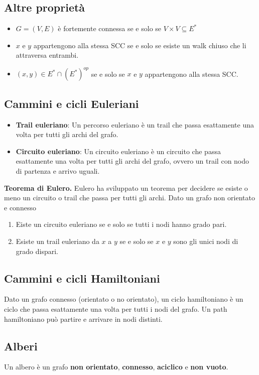 \documentclass{article}
\begin{document}
\subsection*{Altre proprietà}
\begin{itemize}
    \item \(G = (V,E)\) è fortemente connessa se e solo se \(V \times V \subseteq E^*\)
    \item \(x\) e \(y\) appartengono alla stessa SCC se e solo se esiste un walk chiuso che li attraversa entrambi.
    \item \((x,y) \in E^* \cap (E^*)^{op}\) se e solo se \(x\) e \(y\) appartengono alla stessa SCC.
\end{itemize}
\subsection*{Cammini e cicli Euleriani}
\begin{itemize}
    \item \textbf{Trail euleriano}: Un percorso euleriano è un trail che passa esattamente una volta per tutti gli archi del grafo.
    \item \textbf{Circuito euleriano}: Un circuito euleriano è un circuito che passa esattamente una volta per tutti gli archi del grafo, ovvero un trail con nodo di partenza e arrivo uguali.
\end{itemize}
\textbf{Teorema di Eulero.} Eulero ha sviluppato un teorema per decidere se esiste o meno un circuito o trail che passa per tutti gli archi. Dato un grafo non orientato e connesso
\begin{enumerate}
    \item Eiste un circuito euleriano se e solo se tutti i nodi hanno grado pari.
    \item Esiste un trail euleriano da \(x\) a \(y\) se e solo se \(x\) e \(y\) sono gli unici nodi di grado dispari.
\end{enumerate}
\subsection*{Cammini e cicli Hamiltoniani}
Dato un grafo connesso (orientato o no orientato), un ciclo hamiltoniano è un ciclo che passa esattamente una volta per tutti i nodi del grafo. Un path hamiltoniano può partire e arrivare in nodi distinti.

\subsection{Alberi}
Un albero è un grafo \textbf{non orientato}, \textbf{connesso}, \textbf{aciclico} e \textbf{non vuoto}.
\end{document}
